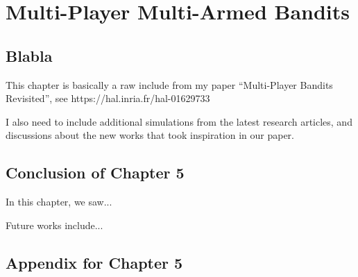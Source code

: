 
\chapter{Multi-Player Multi-Armed Bandits}
\label{chapter:5}
\minitoc
\newpage
\graphicspath{{2-Chapters/5-Chapter/Images/}}

\section{Blabla}
\label{sec:blabla}

This chapter is basically a raw include from my paper ``Multi-Player Bandits Revisited'', see https://hal.inria.fr/hal-01629733

I also need to include additional simulations from the latest research articles, and discussions about the new works that took inspiration in our paper.


\section{Conclusion of Chapter 5}
\label{sec:5:conclusion}

In this chapter, we saw...

Future works include...




\section{Appendix for Chapter 5}
\label{sec:5:appendix}

